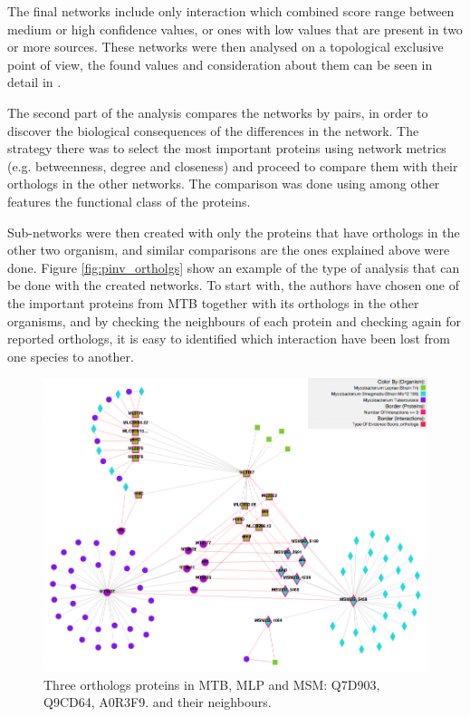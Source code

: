 The final networks include only interaction which combined score range between medium or high confidence values, or ones with low values that are present in two or more sources. These networks were then analysed on a topological exclusive point of view, the found values and consideration about them can be seen in detail in \cite{AKI2013}.

The second part of the analysis compares the networks by pairs, in order to discover the biological consequences of the differences in the network. The strategy there was to select the most important proteins using network metrics (e.g. betweenness, degree and closeness) and proceed to compare them with their orthologs in the other networks. The comparison was done using among other features the functional class of the proteins. 

Sub-networks were then created with only the proteins that have orthologs in the other two organism, and similar comparisons are the ones explained above were done. Figure \ref{fig:pinv_ortholgs} show an example of the type of analysis that can be done with the created networks. To start with, the authors have chosen one of the important proteins from MTB together with its orthologs in the other organisms, and by checking the neighbours of each protein and checking again for reported orthologs, it is easy to identified which interaction have been lost from one species to another.

\begin{figure}
\centering
\includegraphics[width=\textwidth]{figures/pinv_orthologs.png}
\caption[Three orthologs proteins in MTB, MLP and MSM]{Three orthologs proteins in MTB, MLP and MSM: Q7D903, Q9CD64, A0R3F9. and their neighbours.
\label{fig:pinv_orthologs}}
\end{figure}




